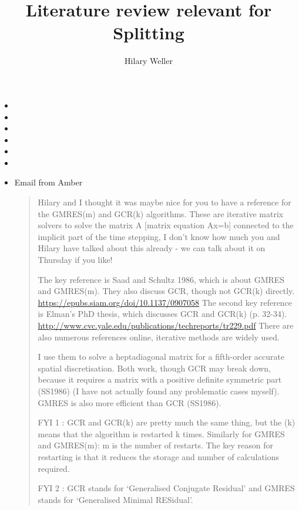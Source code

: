 \documentclass[12pt,british,round,comma,sort&compress]{article}
\begin{document}
\title{Literature review relevant for Splitting}
\author{Hilary Weller}
\maketitle

\begin{itemize}

\item {}

\item {}
\item{}
\item{}
\item{}
\item{}

\item Email from Amber
\begin{quote}
Hilary and I thought it was maybe nice for you to have a reference for the GMRES(m) and GCR(k) algorithms. These are iterative matrix solvers to solve the matrix A [matrix equation Ax=b] connected to the implicit part of the time stepping, I don’t know how much you and Hilary have talked about this already - we can talk about it on Thursday if you like!

The key reference is Saad and Schultz 1986, which is about GMRES and GMRES(m). They also discuss GCR, though not GCR(k) directly. \url{https://epubs.siam.org/doi/10.1137/0907058}
The second key reference is Elman’s PhD thesis, which discusses GCR and GCR(k) (p. 32-34). \url{http://www.cvc.yale.edu/publications/techreports/tr229.pdf}
There are also numerous references online, iterative methods are widely used.

I use them to solve a heptadiagonal matrix for a fifth-order accurate spatial discretisation. Both work, though GCR may break down, because it requires a matrix with a positive definite symmetric part (SS1986) (I have not actually found any problematic cases myself). GMRES is also more efficient than GCR (SS1986).

FYI 1 : GCR and GCR(k) are pretty much the same thing, but the (k) means that the algorithm is restarted k times. Similarly for GMRES and GMRES(m): m is the number of restarts. The key reason for restarting is that it reduces the storage and number of calculations required.

FYI 2 : GCR stands for ‘Generalised Conjugate Residual’ and GMRES stands for ‘Generalised Minimal RESidual’.


\end{quote}
\end{itemize}
\end{document}
